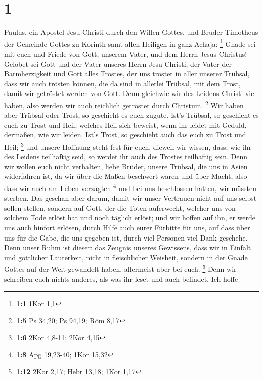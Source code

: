 \hypertarget{section}{%
\section{1}\label{section}}

 Paulus, ein Apostel Jesu Christi durch den Willen Gottes,
und Bruder Timotheus der Gemeinde Gottes zu Korinth samt allen Heiligen
in ganz Achaja: \footnote{\textbf{1:1} 1Kor 1,1}  Gnade
sei mit euch und Friede von Gott, unserem Vater, und dem Herrn Jesus
Christus!  Gelobet sei Gott und der Vater unseres Herrn
Jesu Christi, der Vater der Barmherzigkeit und Gott alles Trostes,
 der uns tröstet in aller unserer Trübsal, dass wir auch
trösten können, die da sind in allerlei Trübsal, mit dem Trost, damit
wir getröstet werden von Gott.  Denn gleichwie wir des
Leidens Christi viel haben, also werden wir auch reichlich getröstet
durch Christum. \footnote{\textbf{1:5} Ps 34,20; Ps 94,19; Röm 8,17}
 Wir haben aber Trübsal oder Trost, so geschieht es euch
zugute. Ist's Trübsal, so geschieht es euch zu Trost und Heil; welches
Heil sich beweist, wenn ihr leidet mit Geduld, dermaßen, wie wir leiden.
Ist's Trost, so geschieht auch das euch zu Trost und Heil; \footnote{\textbf{1:6}
  2Kor 4,8-11; 2Kor 4,15}  und unsere Hoffnung steht fest
für euch, dieweil wir wissen, dass, wie ihr des Leidens teilhaftig seid,
so werdet ihr auch des Trostes teilhaftig sein.  Denn wir
wollen euch nicht verhalten, liebe Brüder, unsere Trübsal, die uns in
Asien widerfahren ist, da wir über die Maßen beschwert waren und über
Macht, also dass wir auch am Leben verzagten \footnote{\textbf{1:8} Apg
  19,23-40; 1Kor 15,32}  und bei uns beschlossen hatten,
wir müssten sterben. Das geschah aber darum, damit wir unser Vertrauen
nicht auf uns selbst sollen stellen, sondern auf Gott, der die Toten
auferweckt,  welcher uns von solchem Tode erlöst hat und
noch täglich erlöst; und wir hoffen auf ihn, er werde uns auch hinfort
erlösen,  durch Hilfe auch eurer Fürbitte für uns, auf
dass über uns für die Gabe, die uns gegeben ist, durch viel Personen
viel Dank geschehe.  Denn unser Ruhm ist dieser: das
Zeugnis unseres Gewissens, dass wir in Einfalt und göttlicher
Lauterkeit, nicht in fleischlicher Weisheit, sondern in der Gnade Gottes
auf der Welt gewandelt haben, allermeist aber bei euch. \footnote{\textbf{1:12}
  2Kor 2,17; Hebr 13,18; 1Kor 1,17}  Denn wir schreiben
euch nichts anderes, als was ihr leset und auch befindet. Ich hoffe
